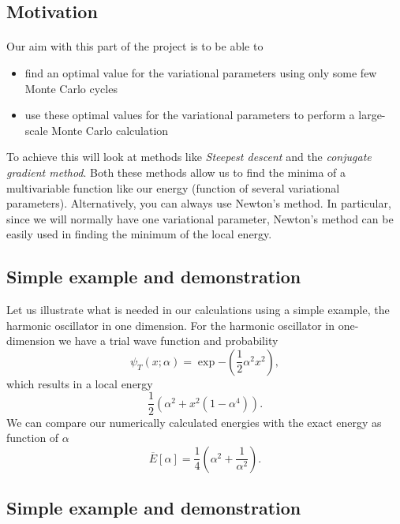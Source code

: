 \documentclass[%
oneside,                 %
final,                   %
10pt]{article}
\begin{document}
\noindent
\subsection*{Motivation}

\paragraph{}
Our aim with this part of the project is to be able to
\begin{itemize}
\item find an optimal value for the variational parameters using only some few Monte Carlo cycles

\item use these optimal values for the variational parameters to perform a large-scale Monte Carlo calculation
\end{itemize}

\noindent
To achieve this will look at methods like \emph{Steepest descent} and the \emph{conjugate gradient method}. Both these methods allow us to find
the minima of a multivariable  function like our energy (function of several variational parameters). 
Alternatively, you can always use Newton's method. In particular, since we will normally have one variational parameter,
Newton's method can be easily used in finding the minimum of the local energy.



\subsection*{Simple example and demonstration}

Let us illustrate what is needed in our calculations using a simple example, the harmonic oscillator in one dimension.
For the harmonic oscillator in one-dimension we have a  trial wave function and probability
\[
\psi_T(x;\alpha) = \exp{-(\frac{1}{2}\alpha^2x^2)},
\]
which results in a local energy 
\[
\frac{1}{2}\left(\alpha^2+x^2(1-\alpha^4)\right).
\]
We can compare our numerically calculated energies with the exact energy as function of $\alpha$
\[
\overline{E}[\alpha] = \frac{1}{4}\left(\alpha^2+\frac{1}{\alpha^2}\right).
\]

\subsection*{Simple example and demonstration}
\end{document}
